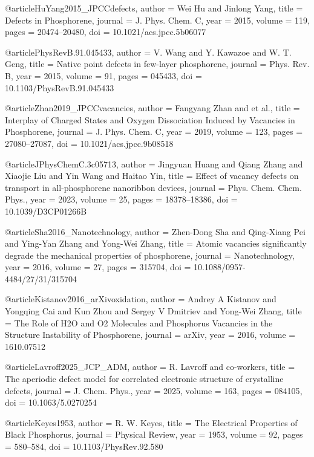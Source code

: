 @article{HuYang2015_JPCCdefects,
  author = {Wei Hu and Jinlong Yang},
  title = {Defects in Phosphorene},
  journal = {J. Phys. Chem. C},
  year = {2015},
  volume = {119},
  pages = {20474--20480},
  doi = {10.1021/acs.jpcc.5b06077}
}

@article{PhysRevB.91.045433,
  author = {V. Wang and Y. Kawazoe and W. T. Geng},
  title = {Native point defects in few-layer phosphorene},
  journal = {Phys. Rev. B},
  year = {2015},
  volume = {91},
  pages = {045433},
  doi = {10.1103/PhysRevB.91.045433}
}

@article{Zhan2019_JPCCvacancies,
  author = {Fangyang Zhan and et al.},
  title = {Interplay of Charged States and Oxygen Dissociation Induced by Vacancies in Phosphorene},
  journal = {J. Phys. Chem. C},
  year = {2019},
  volume = {123},
  pages = {27080--27087},
  doi = {10.1021/acs.jpcc.9b08518}
}

@article{JPhysChemC.3c05713,
  author = {Jingyuan Huang and Qiang Zhang and Xiaojie Liu and Yin Wang and Haitao Yin},
  title = {Effect of vacancy defects on transport in all-phosphorene nanoribbon devices},
  journal = {Phys. Chem. Chem. Phys.},
  year = {2023},
  volume = {25},
  pages = {18378--18386},
  doi = {10.1039/D3CP01266B}
}

@article{Sha2016_Nanotechnology,
  author = {Zhen-Dong Sha and Qing-Xiang Pei and Ying-Yan Zhang and Yong-Wei Zhang},
  title = {Atomic vacancies significantly degrade the mechanical properties of phosphorene},
  journal = {Nanotechnology},
  year = {2016},
  volume = {27},
  pages = {315704},
  doi = {10.1088/0957-4484/27/31/315704}
}

@article{Kistanov2016_arXivoxidation,
  author = {Andrey A Kistanov and Yongqing Cai and Kun Zhou and Sergey V Dmitriev and Yong-Wei Zhang},
  title = {The Role of H2O and O2 Molecules and Phosphorus Vacancies in the Structure Instability of Phosphorene},
  journal = {arXiv},
  year = {2016},
  volume = {1610.07512}
}

@article{Lavroff2025_JCP_ADM,
  author  = {R. Lavroff and co-workers},
  title   = {The aperiodic defect model for correlated electronic structure of crystalline defects},
  journal = {J. Chem. Phys.},
  year    = {2025},
  volume  = {163},
  pages   = {084105},
  doi     = {10.1063/5.0270254}
}


@article{Keyes1953,
  author    = {R. W. Keyes},
  title     = {The Electrical Properties of Black Phosphorus},
  journal   = {Physical Review},
  year      = {1953},
  volume    = {92},
  pages     = {580--584},
  doi       = {10.1103/PhysRev.92.580}
}

